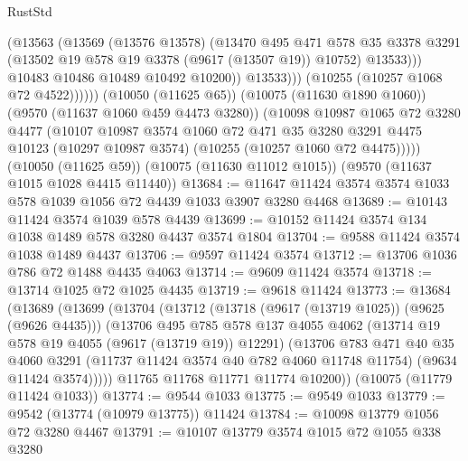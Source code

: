\begin{lexlean}{RustStd}
\begin{coremodule}
{\begin{coremodule}
{{{{{{{{{{{{{{{{{{{{{{{{{{{{{{{{{                        (@13563
                          (@13569
                            (@13576 @13578)
                            (@13470
                              @495
                              @471
                              @578
                              @35
                              @3378
                              @3291
                              (@13502 @19 @578 @19 @3378 (@9617 (@13507 @19)) @10752)
                              @13533)))
                        @10483
                        @10486
                        @10489
                        @10492
                        @10200))
                    @13533)))
              (@10255 (@10257 @1068 @72 @4522))))))
      (@10050 (@11625 @65))
      (@10075 (@11630 @1890 @1060))
      (@9570 (@11637 @1060 @459 @4473 @3280))
      (@10098
        @10987
        @1065
        @72
        @3280
        @4477
        (@10107
          @10987
          @3574
          @1060
          @72
          @471
          @35
          @3280
          @3291
          @4475
          @10123
          (@10297 @10987 @3574)
          (@10255 (@10257 @1060 @72 @4475)))))
    (@10050 (@11625 @59))
    (@10075 (@11630 @11012 @1015))
    (@9570 (@11637 @1015 @1028 @4415 @11440))
@13684 := @11647 @11424 @3574 @3574 @1033 @578 @1039 @1056 @72 @4439 @1033 @3907 @3280 @4468
@13689 := @10143 @11424 @3574 @1039 @578 @4439
@13699 := @10152 @11424 @3574 @134 @1038 @1489 @578 @3280 @4437 @3574 @1804
@13704 := @9588 @11424 @3574 @1038 @1489 @4437
@13706 := @9597 @11424 @3574
@13712 := @13706 @1036 @786 @72 @1488 @4435 @4063
@13714 := @9609 @11424 @3574
@13718 := @13714 @1025 @72 @1025 @4435
@13719 := @9618 @11424
@13773 := @13684
    (@13689
      (@13699
        (@13704
          (@13712
            (@13718 (@9617 (@13719 @1025)) (@9625 (@9626 @4435)))
            (@13706
              @495
              @785
              @578
              @137
              @4055
              @4062
              (@13714 @19 @578 @19 @4055 (@9617 (@13719 @19)) @12291)
              (@13706
                @783
                @471
                @40
                @35
                @4060
                @3291
                (@11737 @11424 @3574 @40 @782 @4060 @11748 @11754)
                (@9634 @11424 @3574)))))
        @11765
        @11768
        @11771
        @11774
        @10200))
    (@10075 (@11779 @11424 @1033))
@13774 := @9544 @1033
@13775 := @9549 @1033
@13779 := @9542 (@13774 (@10979 @13775)) @11424
@13784 := @10098 @13779 @1056 @72 @3280 @4467
@13791 := @10107 @13779 @3574 @1015 @72 @1055 @338 @3280
}}}}}}}}}}}}}}}}}}}}}}}}}}}}}}}}}
\end{coremodule}}
\end{coremodule}
\end{lexlean}

